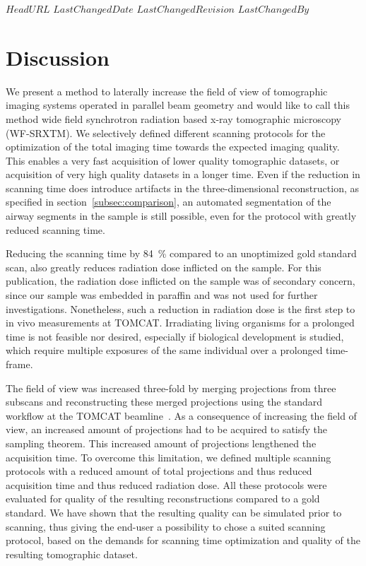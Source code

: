 \svnidlong
{$HeadURL$}
{$LastChangedDate$}
{$LastChangedRevision$}
{$LastChangedBy$}
%
\section{Discussion}\label{sec:Discussion}

We present a method to laterally increase the field of view of tomographic imaging systems operated in parallel beam geometry and would like to call this method wide field synchrotron radiation based x-ray tomographic microscopy (WF-SRXTM). We selectively defined different scanning protocols for the optimization of the total imaging time towards the expected imaging quality. This enables a very fast acquisition of lower quality tomographic datasets, or acquisition of very high quality datasets in a longer time. Even if the reduction in scanning time does introduce artifacts in the three-dimensional reconstruction, as specified in section~\ref{subsec:comparison}, an automated segmentation of the airway segments in the sample is still possible, even for the protocol with greatly reduced scanning time.

Reducing the scanning time by \SI{84}{\percent} compared to an unoptimized gold standard scan, also greatly reduces radiation dose inflicted on the sample. For this publication, the radiation dose inflicted on the sample was of secondary concern, since our sample was embedded in paraffin and was not used for further investigations. Nonetheless, such a reduction in radiation dose is the first step to in vivo measurements at TOMCAT. Irradiating living organisms for a prolonged time is not feasible nor desired, especially if biological development is studied, which require multiple exposures of the same individual over a prolonged time-frame.

The field of view was increased three-fold by merging projections from three subscans and reconstructing these merged projections using the standard workflow at the TOMCAT beamline~\cite{Hintermueller2009}. As a consequence of increasing the field of view, an increased amount of projections had to be acquired to satisfy the sampling theorem. This increased amount of projections lengthened the acquisition time. To overcome this limitation, we defined multiple scanning protocols with a reduced amount of total projections and thus reduced acquisition time and thus reduced radiation dose. All these protocols were evaluated for quality of the resulting reconstructions compared to a gold standard. We have shown that the resulting quality can be simulated prior to scanning, thus giving the end-user a possibility to chose a suited scanning protocol, based on the demands for scanning time optimization and quality of the resulting tomographic dataset.

